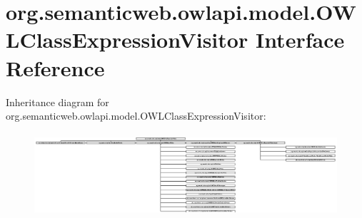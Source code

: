 \hypertarget{interfaceorg_1_1semanticweb_1_1owlapi_1_1model_1_1_o_w_l_class_expression_visitor}{\section{org.\-semanticweb.\-owlapi.\-model.\-O\-W\-L\-Class\-Expression\-Visitor Interface Reference}
\label{interfaceorg_1_1semanticweb_1_1owlapi_1_1model_1_1_o_w_l_class_expression_visitor}
}
Inheritance diagram for org.\-semanticweb.\-owlapi.\-model.\-O\-W\-L\-Class\-Expression\-Visitor\-:\begin{figure}[H]
\begin{center}
\leavevmode
\includegraphics[height=3.111111cm]{interfaceorg_1_1semanticweb_1_1owlapi_1_1model_1_1_o_w_l_class_expression_visitor}
\end{center}
\end{figure}
